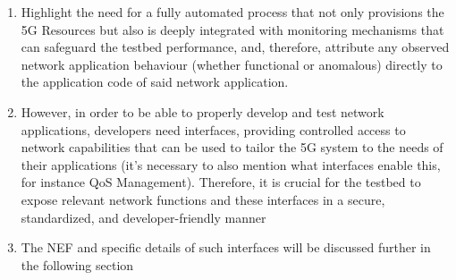 {\begin{enumerate}
    \item Highlight the need for a fully automated process that not only provisions the 5G Resources but also is deeply integrated with monitoring mechanisms that can safeguard the testbed performance, and, therefore, attribute any observed network application behaviour (whether functional or anomalous) directly to the application code of said network application.
    \item However, in order to be able to properly develop and test network applications, developers need interfaces, providing controlled access to network capabilities that can be used to tailor the 5G system to the needs of their applications (it's necessary to also mention what interfaces enable this, for instance QoS Management). Therefore, it is crucial for the testbed to expose relevant network functions and these interfaces in a secure, standardized, and developer-friendly manner
    \item The NEF and specific details of such interfaces will be discussed further in the following section
\end{enumerate}
}

